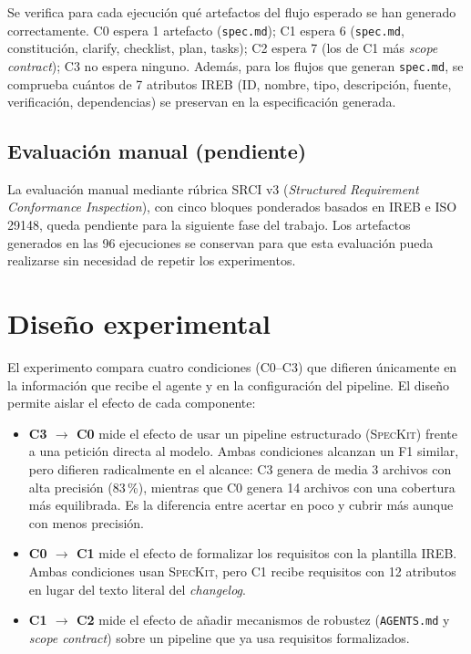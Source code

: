 Se verifica para cada ejecuci\'on qu\'e artefactos del flujo esperado se han generado correctamente. C0 espera 1 artefacto (\texttt{spec.md}); C1 espera 6 (\texttt{spec.md}, constituci\'on, clarify, checklist, plan, tasks); C2 espera 7 (los de C1 m\'as \emph{scope contract}); C3 no espera ninguno. Adem\'as, para los flujos que generan \texttt{spec.md}, se comprueba cu\'antos de 7 atributos IREB (ID, nombre, tipo, descripci\'on, fuente, verificaci\'on, dependencias) se preservan en la especificaci\'on generada.

\subsection{Evaluaci\'on manual (pendiente)}

La evaluaci\'on manual mediante r\'ubrica SRCI v3 (\emph{Structured Requirement Conformance Inspection}), con cinco bloques ponderados basados en IREB e ISO 29148, queda pendiente para la siguiente fase del trabajo. Los artefactos generados en las 96 ejecuciones se conservan para que esta evaluaci\'on pueda realizarse sin necesidad de repetir los experimentos.

\section{Dise\~no experimental}

El experimento compara cuatro condiciones (C0--C3) que difieren \'unicamente en la informaci\'on que recibe el agente y en la configuraci\'on del pipeline. El dise\~no permite aislar el efecto de cada componente:

\begin{itemize}
    \item \textbf{C3 $\rightarrow$ C0} mide el efecto de usar un pipeline estructurado (\textsc{SpecKit}) frente a una petici\'on directa al modelo. Ambas condiciones alcanzan un F1 similar, pero difieren radicalmente en el alcance: C3 genera de media 3 archivos con alta precisi\'on (83\,\%), mientras que C0 genera 14 archivos con una cobertura m\'as equilibrada. Es la diferencia entre acertar en poco y cubrir m\'as aunque con menos precisi\'on.
    \item \textbf{C0 $\rightarrow$ C1} mide el efecto de formalizar los requisitos con la plantilla IREB. Ambas condiciones usan \textsc{SpecKit}, pero C1 recibe requisitos con 12 atributos en lugar del texto literal del \emph{changelog}.
    \item \textbf{C1 $\rightarrow$ C2} mide el efecto de a\~nadir mecanismos de robustez (\texttt{AGENTS.md} y \emph{scope contract}) sobre un pipeline que ya usa requisitos formalizados.
\end{itemize}


